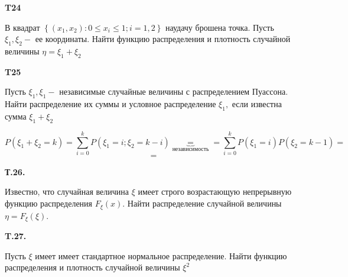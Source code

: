 \documentclass[a4paper,12pt]{article} %
\begin{document}
\begin{example}\textbf{T24}

В квадрат $\left\{\left(x_{1}, x_{2}\right): 0 \leqslant x_{i} \leqslant 1 ; i=1,2\right\}$ наудачу брошена точка. 
Пусть $\xi_{1}, \xi_{2}-$ ее координаты. 
Найти функцию распределения и плотность случайной величины $\eta=\xi_{1}+\xi_{2}$






\end{example}


\begin{example}\textbf{T25}

Пусть $\xi_{1}, \xi_{1} -$ независимые случайные величины с распределением Пуассона. 
Найти распределение их суммы и условное распределение $\xi_{1},$ если известна сумма $\xi_{1}+\xi_{2}$


\[ P(\xi_{1}+\xi_{2}=k)=\sum_{i=0}^{k}P(\xi_{1}=i;\xi_2=k-i) \underbrace{=}_{\text{независимость}}=
\sum_{i=0}^{k}P(\xi_1=i)P(\xi_2=k-1)= \]
\[ = \]







\end{example}




\begin{example}\textbf{Т.26.} 

Известно, что случайная величина $\xi$ имеет строго возрастающую непрерывную функцию распределения $F_{\xi}(x) .$ 
Найти распределение случайной величины $\eta=F_{\xi}(\xi) .$







\end{example}





\begin{example}\textbf{T.27. }


Пусть $\xi$ имеет имеет стандартное нормальное распределение. 
Найти функцию распределения и плотность случайной величины $\xi^{2}$




\end{example}
\end{document}
